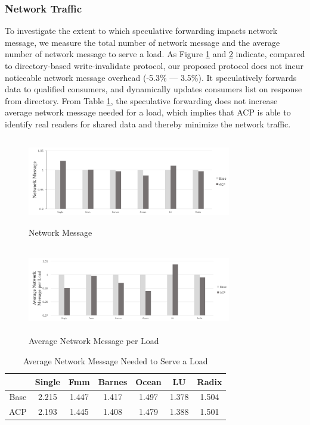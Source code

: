 \documentclass[conference]{IEEEtran}
\begin{document}
\subsubsection{Network Traffic}
To investigate the extent to which speculative forwarding impacts network message, we measure the total number of network message and the average number of network message to serve a load. As Figure \ref{network_msg} and \ref{avg_network_msg_per_load} indicate, compared to directory-based write-invalidate protocol, our proposed protocol does not incur noticeable network message overhead (-5.3\% --- 3.5\%). It speculatively forwards data to qualified consumers, and dynamically updates consumers list on response from directory. From Table \ref{table_msg}, the speculative forwarding does not increase average network message needed for a load, which implies that ACP is able to identify real readers for shared data and thereby minimize the network traffic.

\begin{figure}[!h]
\centering
\captionsetup{justification=centering}
\includegraphics[width=3.5in,height=1.5in]{network_msg.png}
\caption{Network Message}
\label{network_msg}
\end{figure}
\FloatBarrier

\begin{figure}[!h]
\centering
\captionsetup{justification=centering}
\includegraphics[width=3.5in,height=1.5in]{avg_network_msg_per_load.png}
\caption{Average Network Message per Load}
\label{avg_network_msg_per_load}
\end{figure}
\FloatBarrier

\begin{table}[!h]
\renewcommand{\arraystretch}{2.5}
\caption{Average Network Message Needed to Serve a Load}
\label{table_msg}
\centering
\begin{tabular}{|c|c|c|c|c|c|c|}
\hline
 & Single & Fmm & Barnes & Ocean & LU & Radix \\
\hline
Base & 2.215 & 1.447 & 1.417 & 1.497 & 1.378 & 1.504 \\
\hline
ACP & 2.193 & 1.445 & 1.408 & 1.479 & 1.388 & 1.501 \\
\hline
\end{tabular}
\end{table}
\FloatBarrier
\end{document}
